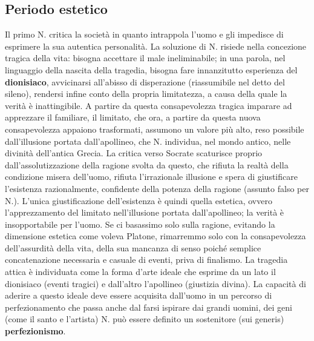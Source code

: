 \documentclass[10pt,a4paper]{article}
\begin{document}
\subsection{Periodo estetico}
Il primo N. critica la società in quanto intrappola l'uomo e gli impedisce di esprimere la sua autentica personalità. La soluzione di N. risiede nella concezione tragica della vita: bisogna accettare il male ineliminabile; in una parola, nel linguaggio della nascita della tragedia, bisogna fare innanzitutto esperienza del \textbf{dionisiaco}, avvicinarsi all'abisso di disperazione (riassumibile nel detto del sileno), rendersi infine conto della propria limitatezza, a causa della quale la verità è inattingibile. A partire da questa consapevolezza tragica imparare ad apprezzare il familiare, il limitato, che ora, a partire da questa nuova consapevolezza appaiono trasformati, assumono un valore più alto, reso possibile dall'illusione portata dall'apollineo, che N. individua, nel mondo antico, nelle divinità dell'antica Grecia. La critica verso Socrate scaturisce proprio dall'assolutizzazione della ragione svolta da questo, che rifiuta la realtà della condizione misera dell'uomo, rifiuta l'irrazionale illusione e spera di giustificare l'esistenza razionalmente, confidente della potenza della ragione (assunto falso per N.). L'unica giustificazione dell'esistenza è quindi quella estetica, ovvero l'apprezzamento del limitato nell'illusione portata dall'apollineo; la verità è insopportabile per l'uomo. Se ci basassimo solo sulla ragione, evitando la dimensione estetica come voleva Platone, rimarremmo solo con la consapevolezza dell'assurdità della vita, della sua mancanza di senso poiché semplice concatenazione necessaria e casuale di eventi, priva di finalismo. La tragedia attica è individuata come la forma d'arte ideale che esprime da un lato il dionisiaco (eventi tragici) e dall'altro l'apollineo (giustizia divina). La capacità di aderire a questo ideale deve essere acquisita dall'uomo in un percorso di perfezionamento che passa anche dal farsi ispirare dai grandi uomini, dei geni (come il santo e l'artista) N. può essere definito un sostenitore (sui generis) \textbf{perfezionismo}.
\end{document}
